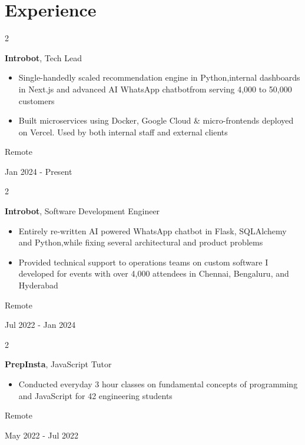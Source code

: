\documentclass[10pt, letterpaper]{article}
\newenvironment{highlights}{
    \begin{itemize}[
        topsep=0.10 cm,
        parsep=0.10 cm,
        partopsep=0pt,
        itemsep=0pt,
        leftmargin=0.4 cm + 10pt
    ]
}{
    \end{itemize}
} %
\newenvironment{twocolentry}[2][]{
    \onecolentry
    \def\secondColumn{#2}
    \setcolumnwidth{\fill, 4.5 cm}
    \begin{paracol}{2}
}{
    \switchcolumn \raggedleft \secondColumn
    \end{paracol}
    \endonecolentry
} %
\begin{document}
    \section{Experience}
        \begin{twocolentry}{
            Remote

        Jan 2024 - Present
        }
            \textbf{Introbot}, Tech Lead
            \begin{highlights}
                \item Single-handedly scaled recommendation engine in Python,\newline internal dashboards in Next.js and advanced AI WhatsApp chatbot\newline from serving 4,000 to 50,000 customers
                \item Built microservices using Docker, Google Cloud \& micro-frontends deployed on Vercel. Used by both internal staff and external clients
            \end{highlights}
        \end{twocolentry}
        \vspace{0.2 cm}
        \begin{twocolentry}{
            Remote

        Jul 2022 - Jan 2024
        }
            \textbf{Introbot}, Software Development Engineer
            \begin{highlights}
                \item Entirely re-written AI powered WhatsApp chatbot in Flask, SQLAlchemy and Python,\newline while fixing several architectural and product problems
                \item Provided technical support to operations teams on custom software I developed for events with over 4,000 attendees in Chennai, Bengaluru, and Hyderabad
            \end{highlights}
        \end{twocolentry}
        \vspace{0.2 cm}
        \begin{twocolentry}{
            Remote

        May 2022 - Jul 2022
        }
            \textbf{PrepInsta}, JavaScript Tutor
            \begin{highlights}
                \item Conducted everyday 3 hour classes on fundamental concepts of programming and JavaScript for 42 engineering students
            \end{highlights}
        \end{twocolentry}
\end{document}
